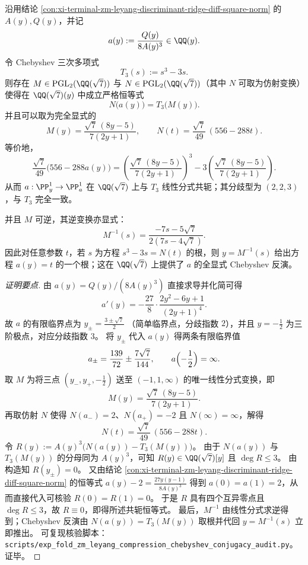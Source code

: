 \begin{conclusion}\label{con:xi-terminal-zm-leyang-compression-chebyshev-conjugacy-explicit}
沿用结论 \ref{con:xi-terminal-zm-leyang-discriminant-ridge-diff-square-norm} 的 \(A(y),Q(y)\)，并记
\[
a(y):=\frac{Q(y)}{8A(y)^3}\in\QQ(y).
\]
令 Chebyshev 三次多项式
\[
T_{3}(s):=s^{3}-3s.
\]
则存在 \(M\in\mathrm{PGL}_{2}(\QQ(\sqrt7))\) 与 \(N\in\mathrm{PGL}_{2}(\QQ(\sqrt7))\)（其中 \(N\) 可取为仿射变换）使得在 \(\QQ(\sqrt7)(y)\) 中成立严格恒等式
\[
N\bigl(a(y)\bigr)=T_{3}\bigl(M(y)\bigr).
\]
并且可以取为完全显式的
\[
M(y)=\frac{\sqrt7\,(8y-5)}{7(2y+1)},
\qquad
N(t)=\frac{\sqrt7}{49}\,(556-288t).
\]
等价地，
\[
\frac{\sqrt7}{49}\bigl(556-288a(y)\bigr)=\left(\frac{\sqrt7\,(8y-5)}{7(2y+1)}\right)^{3}-3\left(\frac{\sqrt7\,(8y-5)}{7(2y+1)}\right).
\]
从而 \(a:\PP^{1}_{y}\to\PP^{1}_{a}\) 在 \(\QQ(\sqrt7)\) 上与 \(T_{3}\) 线性分式共轭；其分歧型为 \((2,2,3)\)，与 \(T_{3}\) 完全一致。
\par
并且 \(M\) 可逆，其逆变换亦显式：
\[
M^{-1}(s)=\frac{-7s-5\sqrt7}{2(7s-4\sqrt7)}.
\]
因此对任意参数 \(t\)，若 \(s\) 为方程 \(s^{3}-3s=N(t)\) 的根，则 \(y=M^{-1}(s)\) 给出方程 \(a(y)=t\) 的一个根；这在 \(\QQ(\sqrt7)\) 上提供了 \(a\) 的全显式 Chebyshev 反演。
\end{conclusion}
\begin{proof}[证明要点]
由 \(a(y)=Q(y)/(8A(y)^3)\) 直接求导并化简可得
\[
a'(y)=-\frac{27}{8}\cdot\frac{2y^{2}-6y+1}{(2y+1)^{4}}.
\]
故 \(a\) 的有限临界点为
\(
y_{\pm}=\frac{3\pm\sqrt7}{2}
\)
（简单临界点，分歧指数 \(2\)），并且 \(y=-\tfrac12\) 为三阶极点，对应分歧指数 \(3\)。
将 \(y_{\pm}\) 代入 \(a(y)\) 得两条有限临界值
\[
a_{\pm}=\frac{139}{72}\pm\frac{7\sqrt7}{144},
\qquad
a\Bigl(-\frac12\Bigr)=\infty.
\]
取 \(M\) 为将三点 \((y_{-},y_{+},-\tfrac12)\) 送至 \((-1,1,\infty)\) 的唯一线性分式变换，即
\[
M(y)=\frac{\sqrt7\,(8y-5)}{7(2y+1)}.
\]
再取仿射 \(N\) 使得 \(N(a_{-})=2\)、\(N(a_{+})=-2\) 且 \(N(\infty)=\infty\)，解得
\[
N(t)=\frac{\sqrt7}{49}\,(556-288t).
\]
令
\(
R(y):=A(y)^{3}\bigl(N(a(y))-T_{3}(M(y))\bigr)
\)。
由于 \(N(a(y))\) 与 \(T_{3}(M(y))\) 的分母同为 \(A(y)^{3}\)，可知 \(R(y)\in\QQ(\sqrt7)[y]\) 且 \(\deg R\le 3\)。
由构造知 \(R(y_{\pm})=0\)。
又由结论 \ref{con:xi-terminal-zm-leyang-discriminant-ridge-diff-square-norm} 的恒等式
\(
a(y)-2=\frac{27y(y-1)}{8A(y)^{3}}
\)
得到 \(a(0)=a(1)=2\)，从而直接代入可核验 \(R(0)=R(1)=0\)。
于是 \(R\) 具有四个互异零点且 \(\deg R\le 3\)，故 \(R\equiv 0\)，即得所述共轭恒等式。
最后，\(M^{-1}\) 由线性分式求逆得到；Chebyshev 反演由 \(N(a(y))=T_{3}(M(y))\) 取根并代回 \(y=M^{-1}(s)\) 立即推出。
可复现核验脚本：\texttt{scripts/exp\_fold\_zm\_leyang\_compression\_chebyshev\_conjugacy\_audit.py}。证毕。
\end{proof}

